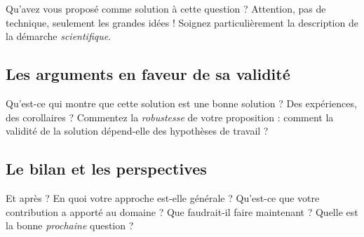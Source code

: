 \documentclass[11pt]{article}
\begin{document}
Qu'avez vous proposé comme solution à cette question ?
Attention, pas de technique, seulement les grandes idées !
Soignez particulièrement la description de la démarche \emph{scientifique}.

\subsection*{Les arguments en faveur de sa validité}

Qu'est-ce qui montre que cette solution est une bonne solution ?
Des expériences, des corollaires ?
Commentez la \emph{robustesse} de votre proposition :
comment la validité de la solution dépend-elle des hypothèses de travail ?

\subsection*{Le bilan et les perspectives}

Et après ? En quoi votre approche est-elle générale ?
Qu'est-ce que votre contribution a apporté au domaine ?
Que faudrait-il faire maintenant ?
Quelle est la bonne \emph{prochaine} question ?
\end{document}
